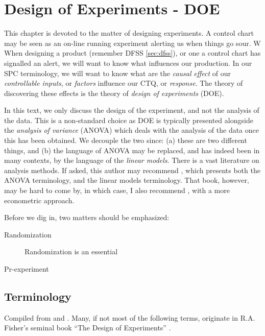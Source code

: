 \chapter[DOE]{Design of Experiments - DOE}

This chapter is devoted to the matter of designing experiments.
A control chart may be seen as an on-line running experiment alerting us when things go sour. W
When designing a product (remember DFSS \ref{sec:dfss}), or one a control chart has signalled an alert, we will want to know what influences our production.
In our SPC terminology, we will want to know what are the \emph{causal} \emph{effect} of our \emph{controllable inputs}, or \emph{factors} influence our CTQ, or \emph{response}. 
The theory of discovering these effects is the theory of \emph{design of experiments} (DOE).



\begin{remark}
In this text, we only discuss the design of the experiment, and not the analysis of the data.
This is a non-standard choice as DOE is typically presented alongside the \emph{analysis of variance} (ANOVA) which deals with the analysis of the data once this has been obtained.
We decouple the two since: 
(a) these are two different things, and 
(b) the language of ANOVA may be replaced, and has indeed been in many contexts, by the language of the \emph{linear models}.
There is a vast literature on analysis methods. 
If asked, this author may recommend \cite{hocking_analysis_1985}, which presents both the ANOVA terminology, and the linear models terminology.
That book, however, may be hard to come by, in which case, I also recommend \cite{greene_econometric_2003}, with a more econometric approach.
\end{remark}


Before we dig in, two matters should be emphasized:
\begin{description}
\item [Randomization] Randomization is an essential 
\item [Pr-experiment]
\end{description}


\section{Terminology}
Compiled from \cite{natrella_nist/sematech_2010} and \cite{mason_statistical_2003}.
Many, if not most of the following terms, originate in R.A. Fisher's seminal book ``The Design of Experiments'' \citep{fisher_design_1960}.


